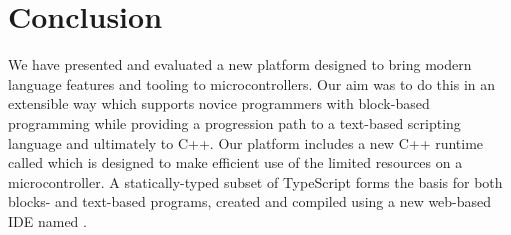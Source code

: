 \section{Conclusion}
\label{sec:conclude}



We have presented and evaluated a new platform designed to bring modern language features and tooling to microcontrollers. Our aim was to do this in an extensible way which supports novice programmers with block-based programming while providing a progression path to a text-based scripting language and ultimately to C++. Our platform includes a new C++ runtime called \CO which is designed to make efficient use of the limited resources on a microcontroller. A statically-typed subset of TypeScript forms the basis for both blocks- and text-based programs, created and compiled using a new web-based IDE named \MC.

